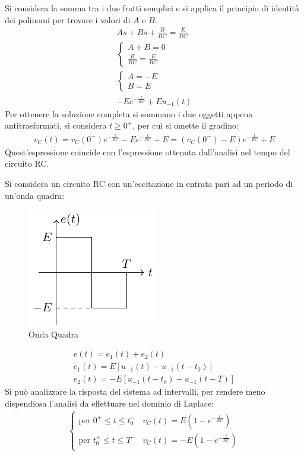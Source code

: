 \documentclass{article}
\numberwithin{equation}{subsection}
\begin{document}
Si considera la somma tra i due fratti semplici e si applica il principio di identità dei polinomi per trovare i valori di $A$ e $B$:
\begin{gather*}
    As+Bs+\displaystyle\frac{B}{RC}=\frac{E}{RC}\\
    \begin{cases}
        A+B=0\\
        \displaystyle\frac{B}{RC}=\frac{E}{RC}
    \end{cases}\\
    \begin{cases}
        A=-E\\
        B=E
    \end{cases}\\
    -Ee^{-\frac{t}{RC}}+Eu_{-1}(t)
\end{gather*}
Per ottenere la soluzione completa si sommano i due oggetti appena antitrasformati, si considera $t\geq0^+$, per cui si omette il gradino:
\begin{gather*}
    v_C(t)=v_C(0^-)e^{-\frac{t}{RC}}-Ee^{-\frac{t}{RC}}+E=(v_C(0^-)-E)e^{-\frac{t}{RC}}+E
\end{gather*}
Quest'espressione coincide con l'espressione ottenuta dall'analisi nel tempo del circuito RC. 



Si considera un circuito RC con un'eccitazione in entrata pari ad un periodo di un'onda quadra:
\begin{figure}[H]%
    \centering
    \includegraphics{onda-quadra.pdf}
    \caption{Onda Quadra}
    \label{fig:onda-quadra}
\end{figure}

\begin{gather*}
    e(t)=e_1(t)+e_2(t)\\
    e_1(t)=E[u_{-1}(t)-u_{-1}(t-t_0)]\\
    e_2(t)=-E[u_{-1}(t-t_0)-u_{-1}(t-T)]
\end{gather*}
Si può analizzare la risposta del sistema ad intervalli, per rendere meno dispendiosa l'analisi da effettuare nel dominio di Laplace:
\begin{gather*}
    \begin{cases}
        \mbox{per }0^+\leq t\leq t_0^-& v_C(t)=E\left(1-e^{-\frac{t}{RC}}\right)\\
        \mbox{per }t_0^+\leq t\leq T^-& v_C(t)=-E\left(1-e^{-\frac{t}{RC}}\right)
    \end{cases}
\end{gather*}
\end{document}
